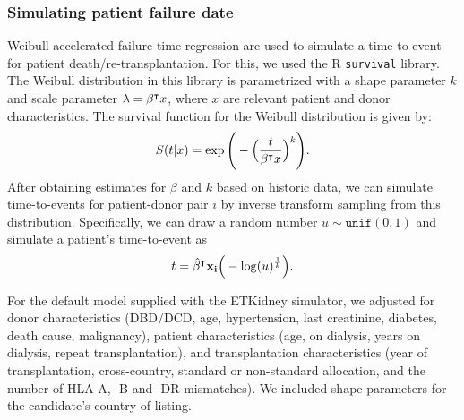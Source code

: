 \subsubsection{Simulating patient failure date}
\label{subsection:sim_time_to_event}
Weibull accelerated failure time regression are used to simulate a time-to-event for patient death/re-transplantation. For this, we used the R \texttt{survival} library. The Weibull distribution in this library is parametrized with a shape parameter $k$ and scale parameter $\lambda = \beta^{{\hspace{-.25pt}\intercal}} x$, where $x$ are relevant patient and donor characteristics. The survival function for the Weibull distribution is given by:
$$S(t|x) = \exp\Bigg(-\Big(\frac{t}{\beta^{{\hspace{-.25pt}\intercal}}x}\Big)^{k}\Bigg).$$
After obtaining estimates for $\beta$ and $k$ based on historic data, we can simulate time-to-events for patient-donor pair $i$ by inverse transform sampling from this distribution. Specifically, we can draw a random number $u \sim \texttt{unif}(0,1)$ and simulate a patient's time-to-event as 
$$t = \hat{\mathbf{\beta}}^{\hspace{-.25pt}\intercal} \mathbf{x_i} \Big(-\log(u)^{\frac{1}{k}}\Big).$$
\par
For the default model supplied with the ETKidney simulator, we adjusted for donor characteristics (DBD/DCD, age, hypertension, last creatinine, diabetes, death cause, malignancy), patient characteristics (age, on dialysis, years on dialysis, repeat transplantation), and transplantation characteristics (year of transplantation, cross-country, standard or non-standard allocation, and the number of HLA-A, -B and -DR mismatches). We included shape parameters for the candidate's country of listing.

